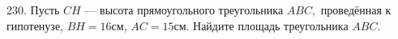 230. Пусть $CH$ --- высота прямоугольного треугольника $ABC,$ проведённая к гипотенузе, $BH=16$см, $AC=15$см. Найдите площадь треугольника $ABC.$\\
